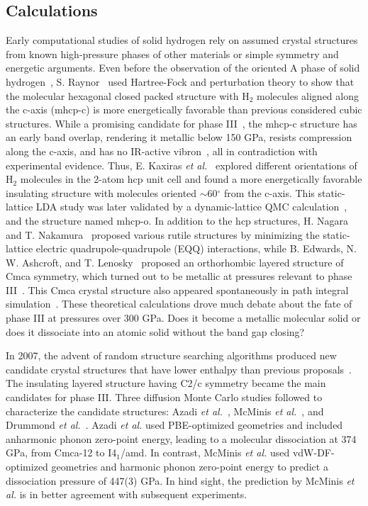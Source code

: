 \subsection{Calculations}
\label{sec:hsolid-calcs}

Early computational studies of solid hydrogen rely on assumed crystal structures from known high-pressure phases of other materials or simple symmetry and energetic arguments. Even before the observation of the oriented A phase of solid hydrogen~\cite{Hemley1988}, S. Raynor~\cite{Raynor1987} used Hartree-Fock and perturbation theory to show that the molecular hexagonal closed packed structure with H$_2$ molecules aligned along the c-axis (mhcp-c) is more energetically favorable than previous considered cubic structures.
While a promising candidate for phase III~\cite{Barbee1989}, the mhcp-c structure has an early band overlap, rendering it metallic below 150 GPa, resists compression along the c-axis, and has no IR-active vibron~\cite{Kaxiras1991,Kaxiras1992}, all in contradiction with experimental evidence.
Thus, E. Kaxiras \textit{et al.}~\cite{Kaxiras1991} explored different orientations of H$_2$ molecules in the 2-atom hcp unit cell and found a more energetically favorable insulating structure with molecules oriented $\sim$60$^{\circ}$ from the c-axis.
This static-lattice LDA study was later validated by a dynamic-lattice QMC calculation~\cite{Natoli1995}, and the structure named mhcp-o.
In addition to the hcp structures, H. Nagara and T. Nakamura~\cite{Nagara1992} proposed various rutile structures by minimizing the static-lattice electric quadrupole-quadrupole (EQQ) interactions, while B. Edwards, N. W. Ashcroft, and T. Lenosky~\cite{Edwards1996} proposed an orthorhombic layered structure of Cmca symmetry, which turned out to be metallic at pressures relevant to phase III~\cite{Johnson2000}.
This Cmca crystal structure also appeared spontaneously in path integral simulation~\cite{Cui2002}.
These theoretical calculations drove much debate about the fate of phase III at pressures over 300 GPa. Does it become a metallic molecular solid or does it dissociate into an atomic solid without the band gap closing?

In 2007, the advent of random structure searching algorithms produced new candidate crystal structures that have lower enthalpy than previous proposals~\cite{Pickard2007}. The insulating layered structure having C2/c symmetry became the main candidates for phase III.
Three diffusion Monte Carlo studies followed to characterize the candidate structures: Azadi \textit{et al.}~\cite{Azadi2014}, McMinis \textit{et al.}~\cite{McMinis2015}, and Drummond \textit{et al.}~\cite{Drummond2015}.
Azadi \textit{et al.} used PBE-optimized geometries and included anharmonic phonon zero-point energy, leading to a molecular dissociation at 374 GPa, from Cmca-12 to I4$_1$/amd.
In contrast, McMinis \textit{et al.} used vdW-DF-optimized geometries and harmonic phonon zero-point energy to predict a dissociation pressure of 447(3) GPa.
In hind sight, the prediction by McMinis \textit{et al.} is in better agreement with subsequent experiments.

